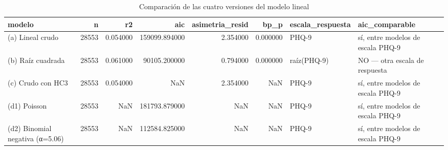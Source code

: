 \begin{table}[htbp]
\caption{Comparación de las cuatro versiones del modelo lineal}
\label{tab:tabla_18_comparacion_modelos_lineales}
\begin{tabular}{lrrrrrll}
\toprule
modelo & n & r2 & aic & asimetria\_resid & bp\_p & escala\_respuesta & aic\_comparable \\
\midrule
(a) Lineal crudo & 28553 & 0.054000 & 159099.894000 & 2.354000 & 0.000000 & PHQ-9 & sí, entre modelos de escala PHQ-9 \\
(b) Raíz cuadrada & 28553 & 0.061000 & 90105.200000 & 0.794000 & 0.000000 & raíz(PHQ-9) & NO — otra escala de respuesta \\
(c) Crudo con HC3 & 28553 & 0.054000 & NaN & 2.354000 & NaN & PHQ-9 & sí, entre modelos de escala PHQ-9 \\
(d1) Poisson & 28553 & NaN & 181793.879000 & NaN & NaN & PHQ-9 & sí, entre modelos de escala PHQ-9 \\
(d2) Binomial negativa (α=5.06) & 28553 & NaN & 112584.825000 & NaN & NaN & PHQ-9 & sí, entre modelos de escala PHQ-9 \\
\bottomrule
\end{tabular}
\end{table}

